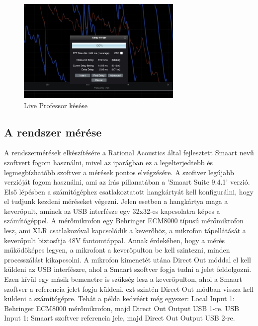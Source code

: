 \begin{figure}[H]
	\centering
	\includegraphics[width=300px, keepaspectratio]{figures/waves_latency.jpg}
	\caption{Live Professor késése}\label{fig:waves_latency}
\end{figure}






\subsection{A rendszer mérése}
A rendszermérések elkészítésére a Rational Acoustics által fejlesztett Smaart nevű szoftvert fogom használni, mivel
az iparágban ez a legelterjedtebb és legmegbízhatóbb szoftver a mérések pontos elvégzésére.
A szoftver legújabb verzióját fogom használni, ami az írás pillanatában a 'Smaart Suite 9.4.1' verzió.
Első lépésben a számítógéphez csatlakoztatott hangkártyát kell konfigurálni, hogy el tudjunk kezdeni méréseket végezni.
Jelen esetben a hangkártya maga a keverőpult, aminek az USB interfésze egy 32x32-es kapcsolatra képes a számítógéppel.
A mérőmikrofon egy Behringer ECM8000 típusú mérőmikrofon lesz, ami XLR csatlakozóval kapcsolódik a keverőhöz, a mikrofon tápellátását
a keverőpult biztosítja 48V fantomtáppal. Annak érdekében, hogy a mérés működőképes legyen, a mikrofont a keverőpulton be kell szintezni, minden 
processzálást kikapcsolni. A mikrofon kimenetét utána Direct Out móddal el kell küldeni az USB interfészre, ahol a Smaart szoftver
fogja tudni a jelet feldolgozni. Ezen kívül egy másik bemenetre is szükség lesz a keverőpulton, ahol a Smaart szoftver a referencia jelet fogja
küldeni, ezt szintén Direct Out módban vissza kell küldeni a számítógépre.
Tehát a példa kedvéért még egyszer:
Local Input 1: Behringer ECM8000 mérőmikrofon, majd Direct Out Output USB 1-re.
USB Input 1: Smaart szoftver referencia jele, majd Direct Out Output USB 2-re.

